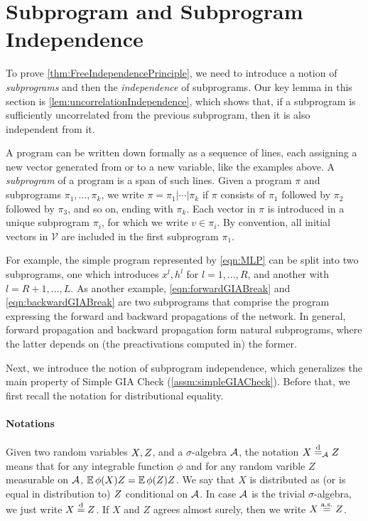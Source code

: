 \documentclass[main.tex]{subfiles}
\begin{document}
\section{Subprogram and Subprogram Independence}

\label{sec:subprogramIndependence}

To prove \cref{thm:FreeIndependencePrinciple}, we need to introduce a notion of \emph{subprograms} and then the \emph{independence} of subprograms.
Our key lemma in this section is \cref{lem:uncorrelationIndependence}, which shows that, if a subprogram is sufficiently uncorrelated from the previous subprogram, then it is also independent from it.
\begin{defn}
A program can be written down formally as a sequence of lines, each assigning a new vector generated from  or  to a new variable, like the examples above. A \emph{subprogram} of a program is a span of such lines. Given a program $\pi$ and subprograms $\pi_{1},\ldots,\pi_{k}$, we write $\pi=\pi_{1}|\cdots|\pi_{k}$ if $\pi$ consists of $\pi_{1}$ followed by $\pi_{2}$ followed by $\pi_{3}$, and so on, ending with $\pi_{k}$. Each vector in $\pi$ is introduced in a unique subprogram $\pi_{i}$, for which we write $v\in\pi_{i}$. By convention, all initial vectors in $\mathcal V$ are included in the first subprogram $\pi_1$.

For example, the simple \netsort{} program represented by \cref{eqn:MLP} can be split into two subprograms, one which introduces $x^l, h^l$ for $l=1,\ldots, R$, and another with $l=R+1,\ldots, L$.
As another example, \cref{eqn:forwardGIABreak} and \cref{eqn:backwardGIABreak} are two subprograms that comprise the program expressing the forward and backward propagations of the network.
In general, forward propagation and backward propagation form natural subprograms, where the latter depends on (the preactivations computed in) the former.

Next, we introduce the notion of subprogram independence, which generalizes the main property of Simple GIA Check (\cref{assm:simpleGIACheck}).
Before that, we first recall the notation for distributional equality.
\paragraph{Notations}
Given two random variables $X, Z$, and a $\sigma$-algebra $\mathcal{A}$, the notation $X \overset{\mathrm{d}}{=}_{\mathcal{A}} Z$ means that for any integrable function $\phi$ and for any random varible $Z$ measurable on $\mathcal{A}$, $\operatorname*{\mathbb{E}} \phi(X) Z = \operatorname*{\mathbb{E}} \phi(Z)Z$.
We say that $X$ is distributed as (or is equal in distribution to) $Z$ conditional on $\mathcal{A}$.
In case $\mathcal{A}$ is the trivial $\sigma$-algebra, we just write $X \overset{\mathrm{d}}{=} Z$.
If $X$ and $Z$ agrees almost surely, then we write $X \overset{\mathrm{a.s.}}{=} Z$.
\end{defn}
\end{document}
